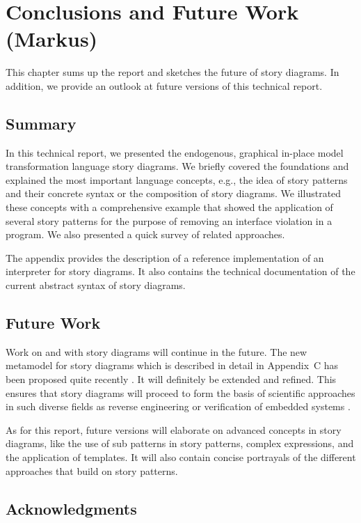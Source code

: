 \chapter{Conclusions and Future Work (Markus)} \label{sec:Conclusion}

This chapter sums up the report and sketches the future of story diagrams. In addition, we provide an outlook at future versions of this technical report.

\section{Summary}

In this technical report, we presented the endogenous, graphical in-place model transformation language story diagrams. We briefly covered the foundations and explained the most important language concepts, e.g., the idea of story patterns and their concrete syntax or the composition of story diagrams. We illustrated these concepts with a comprehensive example that showed the application of several story patterns for the purpose of removing an interface violation in a program. We also presented a quick survey of related approaches.

The appendix provides the description of a reference implementation of an interpreter for story diagrams. It also contains the technical documentation of the current abstract syntax of story diagrams.

\section{Future Work}

Work on and with story diagrams will continue in the future. The new metamodel for story diagrams which is described in detail in Appendix~C has been proposed quite recently \cite{HRvD+11}. It will definitely be extended and refined. This ensures that story diagrams will proceed to form the basis of scientific approaches in such diverse fields as reverse engineering \cite{DMT10} or verification of embedded systems \cite{HSE10}.

As for this report, future versions will elaborate on advanced concepts in story diagrams, like the use of sub patterns in story patterns, complex expressions, and the application of templates. It will also contain concise portrayals of the different approaches that build on story patterns.

\section*{Acknowledgments}

